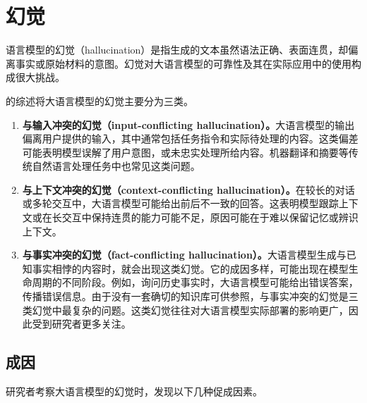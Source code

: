 \section{幻觉}
\label{sec:ch06-hallucination}

\begin{keypoint}
语言模型的幻觉（hallucination）是指生成的文本虽然语法正确、表面连贯，却偏离事实或原始材料的意图。幻觉对大语言模型的可靠性及其在实际应用中的使用构成很大挑战。
\end{keypoint}

的综述将大语言模型的幻觉主要分为三类。

\begin{enumerate}
\item \textbf{与输入冲突的幻觉（input-conflicting hallucination）。}大语言模型的输出偏离用户提供的输入，其中通常包括任务指令和实际待处理的内容。这类偏差可能表明模型误解了用户意图，或未忠实处理所给内容。机器翻译和摘要等传统自然语言处理任务中也常见这类问题。
\item \textbf{与上下文冲突的幻觉（context-conflicting hallucination）。}在较长的对话或多轮交互中，大语言模型可能给出前后不一致的回答。这表明模型跟踪上下文或在长交互中保持连贯的能力可能不足，原因可能在于难以保留记忆或辨识上下文。
\item \textbf{与事实冲突的幻觉（fact-conflicting hallucination）。}大语言模型生成与已知事实相悖的内容时，就会出现这类幻觉。它的成因多样，可能出现在模型生命周期的不同阶段。例如，询问历史事实时，大语言模型可能给出错误答案，传播错误信息。由于没有一套确切的知识库可供参照，与事实冲突的幻觉是三类幻觉中最复杂的问题。这类幻觉往往对大语言模型实际部署的影响更广，因此受到研究者更多关注。
\end{enumerate}

\subsection{成因}
研究者考察大语言模型的幻觉时，发现以下几种促成因素。

